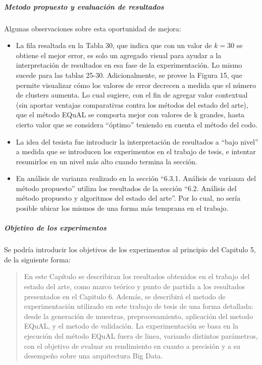 \bigskip

\subparagraph{Metodo propuesto y evaluación de resultados}
Algunas observaciones sobre esta oportunidad de mejora:
\begin{itemize}
	\item La fila resaltada en la Tabla 30, que indica que con un valor de \(k=30\) se obtiene el mejor error, es solo un agregado visual para ayudar a la interpretación de resultados en esa fase de la experimentación. Lo mismo sucede para las tablas 25-30. Adicionalmente, se provee la Figura 15, que permite visualizar cómo los valores de error decrecen a medida que el número de clusters aumenta. Lo cual sugiere, con el fin de agregar valor contextual (sin aportar ventajas comparativas contra los métodos del estado del arte), que el método EQuAL se comporta mejor con valores de k grandes, hasta cierto valor que se considera ``óptimo'' teniendo en cuenta el método del codo.
	\item La idea del tesista fue introducir la interpretación de resultados a ``bajo nivel'' a medida que se introducen los experimentos en el trabajo de tesis, e intentar resumirlos en un nivel más alto cuando termina la sección.
	\item En análisis de varianza realizado en la sección ``6.3.1. Análisis de varianza del método propuesto'' utiliza los resultados de la sección ``6.2. Análisis del método propuesto y algoritmos del estado del arte''. Por lo cual, no sería posible ubicar los mismos de una forma más temprana en el trabajo.
\end{itemize}

\bigskip
\subparagraph{Objetivo de los experimentos}
Se podría introducir los objetivos de los experimentos al principio del Capitulo 5, de la siguiente forma:

\begin{quotation}
	En este Capítulo se describiran los resultados obtenidos en el trabajo del estado del arte, como marco teórico y punto de partida a los resultados presentados en el Capitulo 6. Además, se describirá el metodo de experimentación utilizado en este trabajo de tesis de una forma detallada: desde la generación de muestras, preprocesamiento, aplicación del metodo EQuAL, y el metodo de validación. La experimentación se basa en la ejecución del método EQuAL fuera de linea, variando distintos parámetros, con el objetivo de evaluar su rendimiento en cuanto a precisión y a su desempeño sobre una arquitectura Big Data.
\end{quotation}

